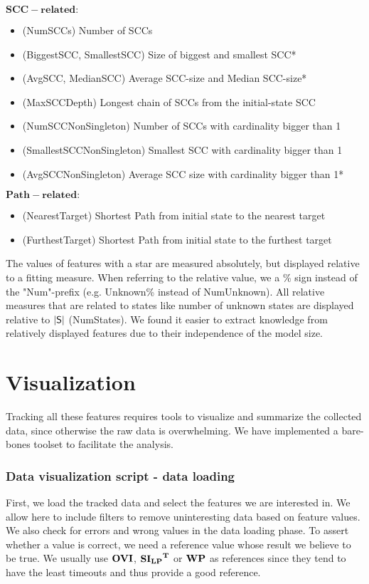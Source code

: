 $\mathbf{SCC-related:}$
\begin{itemize}
\item (NumSCCs) Number of SCCs
\item (BiggestSCC, SmallestSCC) Size of biggest and smallest SCC*
\item (AvgSCC, MedianSCC) Average SCC-size and Median SCC-size*
\item (MaxSCCDepth) Longest chain of SCCs from the initial-state SCC
\item (NumSCCNonSingleton) Number of SCCs with cardinality bigger than 1
\item (SmallestSCCNonSingleton) Smallest SCC with cardinality bigger than 1
\item (AvgSCCNonSingleton) Average SCC size with cardinality bigger than 1*
\end{itemize}

$\mathbf{Path-related}:$
\begin{itemize}
    \item (NearestTarget) Shortest Path from initial state to the nearest target
    \item (FurthestTarget) Shortest Path from initial state to the furthest target
\end{itemize}

The values of features with a star are measured absolutely, but displayed relative to a fitting measure. 
When referring to the relative value, we a \% sign instead of the "Num"-prefix (e.g. Unknown\% instead of NumUnknown).
All relative measures that are related to states like number of unknown states are displayed relative to $|\mathsf{S}|$ (NumStates).
We found it easier to extract knowledge from relatively displayed features due to their independence of the model size. 

\section*{Visualization}

Tracking all these features requires tools to visualize and summarize the collected data, since otherwise the raw data is overwhelming.
We have implemented a bare-bones toolset to facilitate the analysis. 

\subsubsection*{Data visualization script - data loading}
First, we load the tracked data and select the features we are interested in. We allow here to include filters to remove uninteresting data based on feature values.
We also check for errors and wrong values in the data loading phase. To assert whether a value is correct, we need a reference value whose result we believe to be true.
We usually use $\mathbf{OVI}$, $\mathbf{\mathbf{SI_{LP}}^T}$ or $\mathbf{WP}$ as references since they tend to have the least timeouts and thus provide a good reference.

